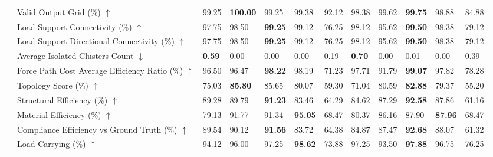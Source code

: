 \begin{table}[!h]
{\begin{tabular}{lllllll|lllll}
 & Valid Output Grid (\%) $\uparrow$ & 99.25 & \textbf{100.00} & 99.25 & 99.38 & 92.12 & 98.38 & 99.62 & \textbf{99.75} & 98.88 & 84.88 \\
 & Load-Support Connectivity (\%) $\uparrow$ & 97.75 & 98.50 & \textbf{99.25} & 99.12 & 76.25 & 98.12 & 95.62 & \textbf{99.50} & 98.38 & 79.12 \\
 & Load-Support Directional Connectivity (\%) $\uparrow$ & 97.75 & 98.50 & \textbf{99.25} & 99.12 & 76.25 & 98.12 & 95.62 & \textbf{99.50} & 98.38 & 79.12 \\
 & Average Isolated Clusters Count $\downarrow$ & \textbf{0.59} & 0.00 & 0.00 & 0.00 & 0.19 & \textbf{0.70} & 0.00 & 0.01 & 0.00 & 0.39 \\
 & Force Path Cost Average Efficiency Ratio (\%) $\uparrow$ & 96.50 & 96.47 & \textbf{98.22} & 98.19 & 71.23 & 97.71 & 91.79 & \textbf{99.07} & 97.82 & 78.28 \\
 & Topology Score (\%) $\uparrow$ & 75.03 & \textbf{85.80} & 85.65 & 80.07 & 59.30 & 71.04 & 80.59 & \textbf{82.88} & 79.37 & 55.20 \\
 & Structural Efficiency (\%) $\uparrow$ & 89.28 & 89.79 & \textbf{91.23} & 83.46 & 64.29 & 84.62 & 87.29 & \textbf{92.58} & 87.86 & 61.16 \\
 & Material Efficiency (\%) $\uparrow$ & 79.13 & 91.77 & 91.34 & \textbf{95.05} & 68.47 & 80.37 & 86.16 & 87.90 & \textbf{87.96} & 68.47 \\
 & Compliance Efficiency vs Ground Truth (\%) $\uparrow$ & 89.54 & 90.12 & \textbf{91.56} & 83.72 & 64.38 & 84.87 & 87.47 & \textbf{92.68} & 88.07 & 61.32 \\
 & Load Carrying (\%) $\uparrow$ & 94.12 & 96.00 & 97.25 & \textbf{98.62} & 73.88 & 97.25 & 93.50 & \textbf{97.88} & 96.75 & 76.25 \\
    \bottomrule
  \end{tabular}
  }
\end{table}